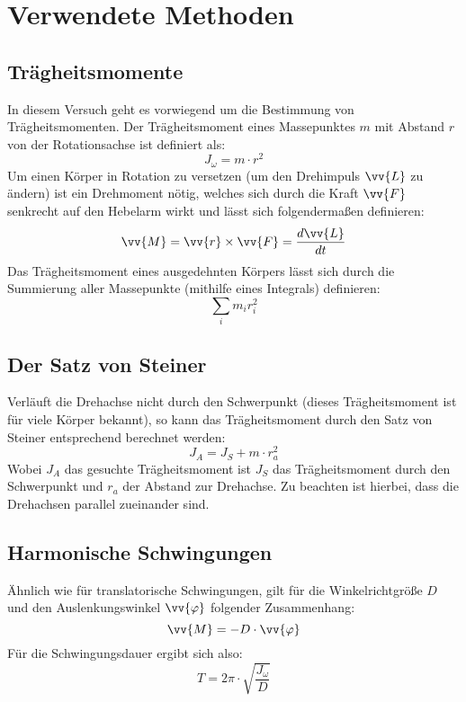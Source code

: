 \section{Verwendete Methoden}
\subsection{Trägheitsmomente}
In diesem Versuch geht es vorwiegend um die Bestimmung von Trägheitsmomenten. Der Trägheitsmoment eines Massepunktes $m$ mit Abstand $r$ von der Rotationsachse ist definiert als:
\begin{equation}
J_{\omega} = m \cdot r^2
\end{equation}
Um einen Körper in Rotation zu versetzen (um den Drehimpuls $\vv{L}$ zu ändern) ist ein Drehmoment nötig, welches sich durch die Kraft $\vv{F}$ senkrecht auf den Hebelarm wirkt und lässt sich folgendermaßen definieren:
\begin{equation}
\vv{M} = \vv{r} \times \vv{F} = \frac{d\vv{L}}{dt}
\end{equation}
Das Trägheitsmoment eines ausgedehnten Körpers lässt sich durch die Summierung aller Massepunkte (mithilfe eines Integrals) definieren:
\begin{equation}
\sum_i m_i r_i^2
\label{eq:traeg}
\end{equation}
\subsection{Der Satz von Steiner}
Verläuft die Drehachse nicht durch den Schwerpunkt (dieses Trägheitsmoment ist für viele Körper bekannt), so kann das Trägheitsmoment durch den Satz von Steiner entsprechend berechnet werden:
\begin{equation}
J_A = J_S + m \cdot r_a^2
\label{eq:steiner}
\end{equation}
Wobei $J_A$ das gesuchte Trägheitsmoment ist $J_S$ das Trägheitsmoment durch den Schwerpunkt und $r_a$ der Abstand zur Drehachse. Zu beachten ist hierbei, dass die Drehachsen parallel zueinander sind.

\subsection{Harmonische Schwingungen}
Ähnlich wie für translatorische Schwingungen, gilt für die Winkelrichtgröße $D$ und den Auslenkungswinkel $\vv{\varphi}$ folgender Zusammenhang:
\begin{equation*}
\vv{M} = -D \cdot \vv{\varphi}
\end{equation*}
Für die Schwingungsdauer ergibt sich also:
\begin{equation}
T = 2\pi \cdot \sqrt{\frac{J_{\omega}}{D}}
\label{eq:wink}
\end{equation}

